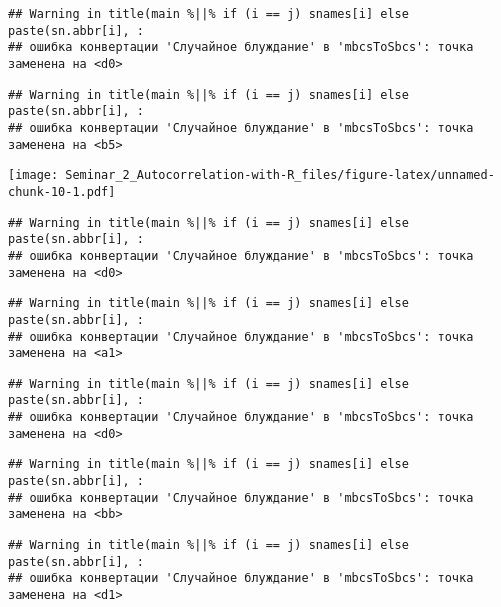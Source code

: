 \documentclass[
]{article}
\newenvironment{Shaded}{\begin{snugshade}}{\end{snugshade}}
\newcommand{\AttributeTok}[1]{\textcolor[rgb]{0.13,0.29,0.53}{#1}}
\newcommand{\DecValTok}[1]{\textcolor[rgb]{0.00,0.00,0.81}{#1}}
\newcommand{\FunctionTok}[1]{\textcolor[rgb]{0.13,0.29,0.53}{\textbf{#1}}}
\newcommand{\NormalTok}[1]{#1}
\newcommand{\SpecialCharTok}[1]{\textcolor[rgb]{0.81,0.36,0.00}{\textbf{#1}}}
\newcommand{\StringTok}[1]{\textcolor[rgb]{0.31,0.60,0.02}{#1}}
\begin{document}
\begin{verbatim}
## Warning in title(main %||% if (i == j) snames[i] else paste(sn.abbr[i], :
## ошибка конвертации 'Случайное блуждание' в 'mbcsToSbcs': точка заменена на <d0>
\end{verbatim}

\begin{verbatim}
## Warning in title(main %||% if (i == j) snames[i] else paste(sn.abbr[i], :
## ошибка конвертации 'Случайное блуждание' в 'mbcsToSbcs': точка заменена на <b5>
\end{verbatim}

\texttt{[image: Seminar\_2\_Autocorrelation-with-R\_files/figure-latex/unnamed-chunk-10-1.pdf]}

\begin{Shaded}
\end{Shaded}

\begin{verbatim}
## Warning in title(main %||% if (i == j) snames[i] else paste(sn.abbr[i], :
## ошибка конвертации 'Случайное блуждание' в 'mbcsToSbcs': точка заменена на <d0>
\end{verbatim}

\begin{verbatim}
## Warning in title(main %||% if (i == j) snames[i] else paste(sn.abbr[i], :
## ошибка конвертации 'Случайное блуждание' в 'mbcsToSbcs': точка заменена на <a1>
\end{verbatim}

\begin{verbatim}
## Warning in title(main %||% if (i == j) snames[i] else paste(sn.abbr[i], :
## ошибка конвертации 'Случайное блуждание' в 'mbcsToSbcs': точка заменена на <d0>
\end{verbatim}

\begin{verbatim}
## Warning in title(main %||% if (i == j) snames[i] else paste(sn.abbr[i], :
## ошибка конвертации 'Случайное блуждание' в 'mbcsToSbcs': точка заменена на <bb>
\end{verbatim}

\begin{verbatim}
## Warning in title(main %||% if (i == j) snames[i] else paste(sn.abbr[i], :
## ошибка конвертации 'Случайное блуждание' в 'mbcsToSbcs': точка заменена на <d1>
\end{verbatim}
\end{document}
